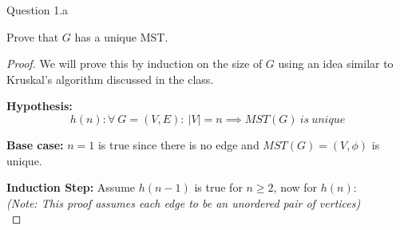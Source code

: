 \label{ques:1a}\begin{solution}{Question 1.a}
    \begin{question}[]
        Prove that $G$ has a unique MST.\@
    \end{question}
    \tcblower{}
    \begin{proof}
        We will prove this by induction on the size of $G$ using an idea similar to Kruskal's algorithm discussed in the class.

        \textbf{Hypothesis:}
        \begin{equation}
            h(n): \forall\ G=(V,E):\ |V|=n\implies MST(G)\ is\ unique
        \end{equation}

        \textbf{Base case:} $n=1$ is true since there is no edge and $MST(G)=(V,\phi)$ is unique.

        \textbf{Induction Step:} Assume $h(n-1)$ is true for $n\geq 2$, now for $h(n)$:\\
        \textit{(Note: This proof assumes each edge to be an unordered pair of vertices)}\\


\end{proof}
\end{solution}
